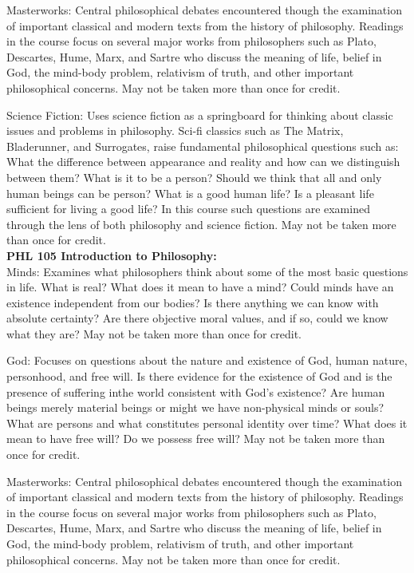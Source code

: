 \documentclass[
  letterpaper,
]{scrbook}
\begin{document}
Masterworks: Central philosophical debates encountered though the
examination of important classical and modern texts from the history of
philosophy. Readings in the course focus on several major works from
philosophers such as Plato, Descartes, Hume, Marx, and Sartre who
discuss the meaning of life, belief in God, the mind-body problem,
relativism of truth, and other important philosophical concerns. May not
be taken more than once for credit.

Science Fiction: Uses science fiction as a springboard for thinking
about classic issues and problems in philosophy. Sci-fi classics such as
The Matrix, Bladerunner, and Surrogates, raise fundamental philosophical
questions such as: What the difference between appearance and reality
and how can we distinguish between them? What is it to be a person?
Should we think that all and only human beings can be person? What is a
good human life? Is a pleasant life sufficient for living a good life?
In this course such questions are examined through the lens of both
philosophy and science fiction. May not be taken more than once for
credit.\\
\textbf{PHL 105 Introduction to Philosophy:}\\
Minds: Examines what philosophers think about some of the most basic
questions in life. What is real? What does it mean to have a mind? Could
minds have an existence independent from our bodies? Is there anything
we can know with absolute certainty? Are there objective moral values,
and if so, could we know what they are? May not be taken more than once
for credit.

God: Focuses on questions about the nature and existence of God, human
nature, personhood, and free will. Is there evidence for the existence
of God and is the presence of suffering inthe world consistent with
God's existence? Are human beings merely material beings or might we
have non-physical minds or souls? What are persons and what constitutes
personal identity over time? What does it mean to have free will? Do we
possess free will? May not be taken more than once for credit.

Masterworks: Central philosophical debates encountered though the
examination of important classical and modern texts from the history of
philosophy. Readings in the course focus on several major works from
philosophers such as Plato, Descartes, Hume, Marx, and Sartre who
discuss the meaning of life, belief in God, the mind-body problem,
relativism of truth, and other important philosophical concerns. May not
be taken more than once for credit.
\end{document}
